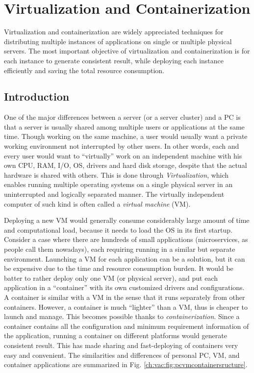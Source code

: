 \chapter{Virtualization and Containerization}

Virtualization and containerization are widely appreciated techniques for distributing multiple instances of applications on single or multiple physical servers. The most important objective of virtualization and containerization is for each instance to generate consistent result, while deploying each instance efficiently and saving the total resource consumption.

\section{Introduction}

One of the major differences between a server (or a server cluster) and a PC is that a server is usually shared among multiple users or applications at the same time. Though working on the same machine, a user would usually want a private working environment not interrupted by other users. In other words, each and every user would want to ``virtually'' work on an independent machine with his own CPU, RAM, I/O, OS, drivers and hard disk storage, despite that the actual hardware is shared with others. This is done through \textit{Virtualization}, which enables running multiple operating systems on a single physical server in an uninterrupted and logically separated manner. The virtually independent computer of such kind is often called a \textit{virtual machine} (VM).

Deploying a new VM would generally consume considerably large amount of time and computational load, because it needs to load the OS in its first startup. Consider a case where there are hundreds of small applications (microservices, as people call them nowadays), each requiring running in a similar but separate environment. Launching a VM for each application can be a solution, but it can be expensive due to the time and resource consumption burden. It would be batter to rather deploy only one VM (or physical server), and put each application in a ``container'' with its own customized drivers and configurations. A container is similar with a VM in the sense that it runs separately from other containers. However, a container is much ``lighter'' than a VM, thus is cheaper to launch and manage. This becomes possible thanks to \textit{containerization}. Since a container contains all the configuration and minimum requirement information of the application, running a container on different platforms would generate consistent result. This has made sharing and fast-deploying of containers very easy and convenient. The similarities and differences of personal PC, VM, and container applications are summarized in Fig. \ref{ch:vac:fig:pcvmcontainersructure}.

